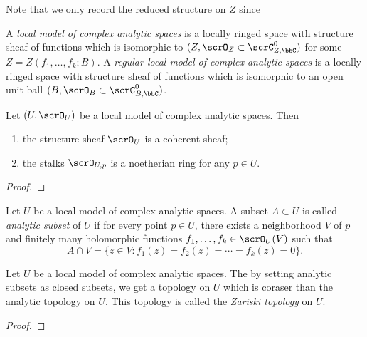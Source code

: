 \begin{remark}
	Note that we only record the reduced structure on $Z$ since
\end{remark}

\begin{definition}\label{def:local-model-of-complex-analytic-spaces}
	A \emph{local model of complex analytic spaces} is a locally ringed space with structure sheaf of functions which is isomorphic to $(Z,\scrO_Z \subset \scrC_{Z,\bbC}^0)$ for some $Z = Z(f_1,\ldots,f_k;B)$.
	A \emph{regular local model of complex analytic spaces} is a locally ringed space with structure sheaf of functions which is isomorphic to an open unit ball $(B,\scrO_B \subset \scrC_{B,\bbC}^0)$.
\end{definition}

\begin{proposition}\label{prop:coherence-of-structure-sheaf-and-noetherianity-of-stalks-for-local-models}
	Let $(U,\scrO_U)$ be a local model of complex analytic spaces.
	Then
	\begin{enumerate}
		\item the structure sheaf $\scrO_U$ is a coherent sheaf;
		\item the stalks $\scrO_{U,p}$ is a noetherian ring for any $p \in U$.
	\end{enumerate}
\end{proposition}
\begin{proof}
	\Yang{}
\end{proof}

\begin{definition}\label{def:analytic-subset-of-local-model}
	Let $U$ be a local model of complex analytic spaces.
	A subset $A \subset U$ is called \emph{analytic subset} of $U$ if for every point \(p \in U\), there exists a neighborhood \(V\) of \(p\)
	and finitely many holomorphic functions \(f_1, \ldots, f_k \in \scrO_U(V)\) such that
	\[ A \cap V = \{ z \in V : f_1(z) = f_2(z) = \cdots = f_k(z) = 0 \}. \]
	\Yang{}
\end{definition}

\begin{lemma}
	Let $U$ be a local model of complex analytic spaces.
	The by setting analytic subsets as closed subsets, we get a topology on $U$ which is coraser than the analytic topology on $U$.
	This topology is called the \emph{Zariski topology} on $U$.
\end{lemma}
\begin{proof}
\end{proof}


